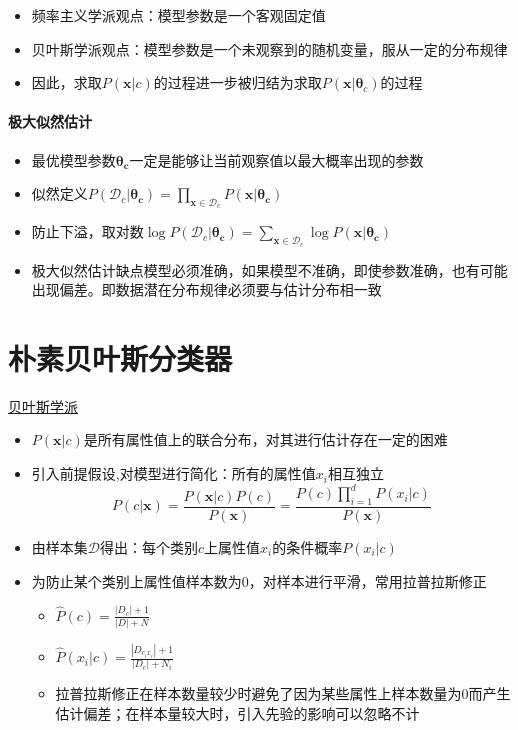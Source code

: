 \begin{itemize}
\item 频率主义学派观点：模型参数是一个客观固定值
\item 贝叶斯学派观点：模型参数是一个未观察到的随机变量，服从一定的分布规律
\item 因此，求取$P(\bm{x}|c)$的过程进一步被归结为求取$P(\bm{x}|\bm{\theta}_c)$的过程
\end{itemize}

\paragraph{极大似然估计}

\begin{itemize}
\item 最优模型参数$\bm{\theta_c}$一定是能够让当前观察值以最大概率出现的参数
\item 似然定义$P(\mathcal{D}_c|\bm{\theta_c})=\prod_{\bm{x}\in\mathcal{D}_c}P(\bm{x}|\bm{\theta_c})$
\item 防止下溢，取对数$\log P(\mathcal{D}_c|\bm{\theta_c})=\sum_{\bm{x}\in\mathcal{D}_c}\log P(\bm{x}|\bm{\theta_c})$
\item 极大似然估计缺点模型必须准确，如果模型不准确，即使参数准确，也有可能出现偏差。即数据潜在分布规律必须要与估计分布相一致
\end{itemize}

\section{朴素贝叶斯分类器}
\underline{贝叶斯学派}

\begin{itemize}
\item $P(\bm{x}|c)$是所有属性值上的联合分布，对其进行估计存在一定的困难
\item 引入前提假设,对模型进行简化：所有的属性值$x_i$相互独立$$P(c|\bm{x})=\frac{P(\bm{x}|c)P(c)}{P(\bm{x})}=\frac{P(c)\prod_{i=1}^dP(x_i|c)}{P(\bm{x})}$$
\item 由样本集$\mathcal{D}$得出：每个类别$c$上属性值$x_i$的条件概率$P(x_i|c)$
\item 为防止某个类别上属性值样本数为0，对样本进行平滑，常用拉普拉斯修正
    \begin{itemize}
    \item $\widehat{P}(c)=\frac{|D_c|+1}{|D|+N}$
    \item $\widehat{P}(x_i|c)=\frac{|D_{c_ix_i}|+1}{|D_c|+N_i}$
    \item 拉普拉斯修正在样本数量较少时避免了因为某些属性上样本数量为0而产生估计偏差；在样本量较大时，引入先验的影响可以忽略不计
    \end{itemize}
\end{itemize}

